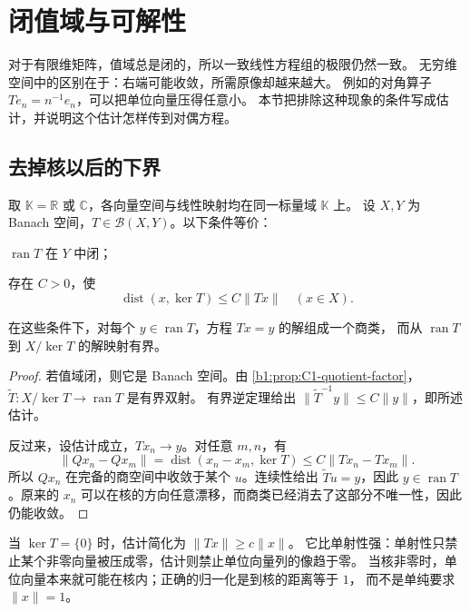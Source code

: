 \section{闭值域与可解性}
\label{b1:sec:C103}

对于有限维矩阵，值域总是闭的，所以一致线性方程组的极限仍然一致。
无穷维空间中的区别在于：右端可能收敛，所需原像却越来越大。
例如的对角算子 \(Te_n=n^{-1}e_n\)，可以把单位向量压得任意小。
本节把排除这种现象的条件写成估计，并说明这个估计怎样传到对偶方程。

\subsection{去掉核以后的下界}
\label{b1:subsec:C10301}

\begin{theorem}[闭值域的估计判别]\label{b1:thm:C1-closed-range-estimate}
取 \(\mathbb K=\mathbb R\) 或 \(\mathbb C\)，各向量空间与线性映射均在同一标量域 \(\mathbb K\) 上。
设 \(X,Y\) 为 Banach 空间，\(T\in\mathcal B(X,Y)\)。以下条件等价：
\begin{equivalences}
\item\label{b1:item:C1-range-closed}\(\operatorname{ran}T\) 在 \(Y\) 中闭；
\item\label{b1:item:C1-quotient-bound}存在 \(C>0\)，使
\[
 \operatorname{dist}(x,\ker T)\leq C\|Tx\|\quad(x\in X).
\]
\end{equivalences}
在这些条件下，对每个 \(y\in\operatorname{ran}T\)，方程 \(Tx=y\) 的解组成一个商类，
而从 \(\operatorname{ran}T\) 到 \(X/\ker T\) 的解映射有界。
\end{theorem}
\begin{proof}
若值域闭，则它是 Banach 空间。由%
\cref{b1:prop:C1-quotient-factor}，
\(\widetilde T:X/\ker T\rightarrow\operatorname{ran}T\) 是有界双射。
有界逆定理给出 \(\|\widetilde T^{-1}y\|\leq C\|y\|\)，即所述估计。

反过来，设估计成立，\(Tx_n\rightarrow y\)。对任意 \(m,n\)，有
\[
 \|Qx_n-Qx_m\|
 =\operatorname{dist}(x_n-x_m,\ker T)
 \leq C\|Tx_n-Tx_m\|.
\]
所以 \(Qx_n\) 在完备的商空间中收敛于某个 \(u\)。连续性给出
\(\widetilde Tu=y\)，因此 \(y\in\operatorname{ran}T\)。原来的 \(x_n\) 可以在核的方向任意漂移，而商类已经消去了这部分不唯一性，因此仍能收敛。
\end{proof}

当 \(\ker T=\{0\}\) 时，估计简化为 \(\|Tx\|\geq c\|x\|\)。
它比单射性强：单射性只禁止某个非零向量被压成零，估计则禁止单位向量列的像趋于零。
当核非零时，单位向量本来就可能在核内；正确的归一化是到核的距离等于 \(1\)，
而不是单纯要求 \(\|x\|=1\)。


